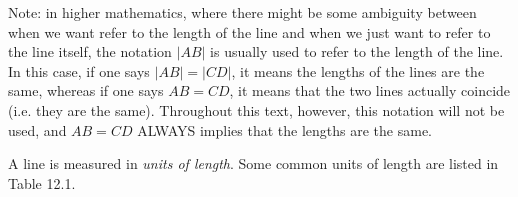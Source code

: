 \par 
      \label{m39370*eip-313}Note: in higher mathematics, where there might be some ambiguity between when we want refer to the length of the line and when we just want to refer to the line itself, the notation \begin{math}|AB|\end{math}\hspace{1ex} is usually used to refer to the length of the line. In this case, if one says \begin{math}|AB|=|CD|\end{math}, it means the lengths of the lines are the same, whereas if one says \begin{math}AB=CD\end{math}, it means that the two lines actually coincide (i.e. they are the same). Throughout this text, however, this notation will not be used, and \begin{math}AB=CD\end{math} ALWAYS implies that the lengths are the same. \par \label{m39370*id314000}A line is measured in \textsl{units of length}. Some common units of length are listed in Table 12.1.\par 
      
    
      
    
    \setlength\mytablespace{4\tabcolsep}
    \addtolength\mytablespace{3\arrayrulewidth}
    \setlength\mytablewidth{\linewidth}
        
    
    \setlength\mytableroom{\mytablewidth}
    \addtolength\mytableroom{-\mytablespace}
    
    \setlength\myfixedwidth{0pt}
    \setlength\mystarwidth{\mytableroom}
        \addtolength\mystarwidth{-\myfixedwidth}
        \divide{}
        
